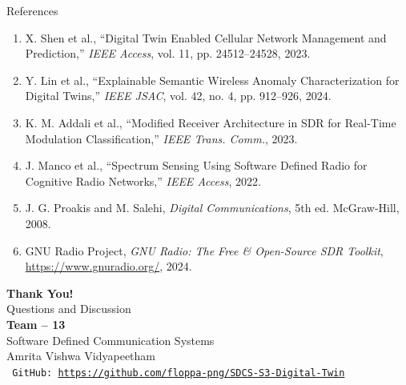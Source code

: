\documentclass[aspectratio=169, 10pt]{beamer}
\begin{document}
\begin{frame}{References}
  \footnotesize
  \begin{enumerate}\setlength{\itemsep}{7pt}
    \item X. Shen et al., ``Digital Twin Enabled Cellular Network Management and Prediction,'' \textit{IEEE Access}, vol. 11, pp. 24512--24528, 2023.
    \item Y. Lin et al., ``Explainable Semantic Wireless Anomaly Characterization for Digital Twins,'' \textit{IEEE JSAC}, vol. 42, no. 4, pp. 912--926, 2024.
    \item K. M. Addali et al., ``Modified Receiver Architecture in SDR for Real-Time Modulation Classification,'' \textit{IEEE Trans. Comm.}, 2023.
    \item J. Manco et al., ``Spectrum Sensing Using Software Defined Radio for Cognitive Radio Networks,'' \textit{IEEE Access}, 2022.
    \item J. G. Proakis and M. Salehi, \textit{Digital Communications}, 5th ed. McGraw-Hill, 2008.
    \item GNU Radio Project, \textit{GNU Radio: The Free \& Open-Source SDR Toolkit}, \url{https://www.gnuradio.org/}, 2024.
  \end{enumerate}
\end{frame}

\begin{frame}
  \vspace{1.0cm}
  \begin{center}
    {\fontsize{26}{32}\selectfont\textbf{\color{primaryblue} Thank You!}}\\[0.60cm]
    {\fontsize{14}{18}\selectfont Questions and Discussion}\\[0.80cm]
    {\fontsize{10}{13}\selectfont\textbf{Team -- 13}}\\[0.15cm]
    {\fontsize{9}{12}\selectfont Software Defined Communication Systems}\\[0.08cm]
    {\fontsize{9}{12}\selectfont Amrita Vishwa Vidyapeetham}\\[0.50cm]
    {\fontsize{8}{10}\selectfont\texttt{\color{gray} GitHub: \href{https://github.com/floppa-png/SDCS-S3-Digital-Twin}{https://github.com/floppa-png/SDCS-S3-Digital-Twin}}}
  \end{center}
\end{frame}
\end{document}
